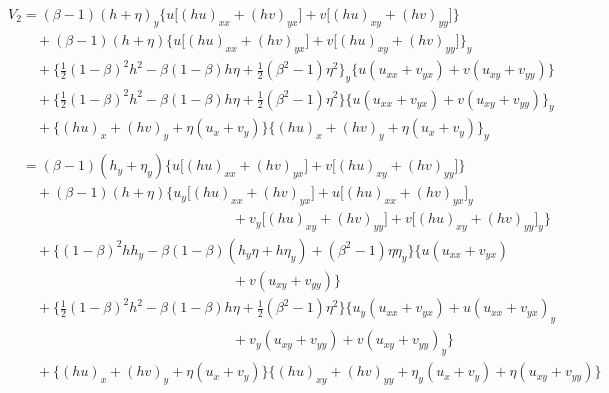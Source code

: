 \documentclass[11pt]{article}
\begin{document}
\newpage
\begin{eqnarray}
&&V_2=  (\beta-1)(h+\eta)_y \bigg\{
        u \Big[ (hu)_{xx} + (hv)_{yx} \Big] +  v \Big[ (hu)_{xy} + (hv)_{yy} \Big] \bigg\}
        \nonumber \\
&& \quad \quad
        + (\beta-1)(h+\eta) \bigg\{
        u \Big[ (hu)_{xx} + (hv)_{yx} \Big] +  v \Big[ (hu)_{xy} + (hv)_{yy} \Big] \bigg\}_y
        \nonumber \\
&& \quad \quad
        +\bigg\{ \frac{1}{2} (1-\beta)^2 h^2 - \beta (1-\beta) h \eta + \frac{1}{2} (\beta^2-1) \eta^2 \bigg\}_y
        \Big\{ u ( u_{xx} + v_{yx} ) + v ( u_{xy} + v_{yy} ) \Big\}   \nonumber  \\
&& \quad \quad
        +\bigg\{ \frac{1}{2} (1-\beta)^2 h^2 - \beta (1-\beta) h \eta + \frac{1}{2} (\beta^2-1) \eta^2 \bigg\}
        \Big\{ u ( u_{xx} + v_{yx} ) + v ( u_{xy} + v_{yy} ) \Big\}_y   \nonumber  \\
&& \quad \quad
        +\Big\{
        (hu)_x + (hv)_y + \eta (u_x+v_y) \Big\}
        \Big\{
        (hu)_x + (hv)_y + \eta (u_x+v_y) \Big\}_y
        \nonumber  \\
        \nonumber  \\
&& \quad
     = (\beta-1)(h_y + \eta_y) \bigg\{
        u \Big[ (hu)_{xx} + (hv)_{yx} \Big] +  v \Big[ (hu)_{xy} + (hv)_{yy} \Big] \bigg\}
        \nonumber \\
&& \quad \quad
        + (\beta-1)(h+\eta) \bigg\{
            u_y \Big[ (hu)_{xx} + (hv)_{yx} \Big]
          + u \Big[ (hu)_{xx} + (hv)_{yx} \Big]_y
        \nonumber \\
&& \quad \quad \quad \quad \quad \quad \quad \quad
   \quad \quad \quad \quad \quad \quad \quad \quad
          + v_y \Big[ (hu)_{xy} + (hv)_{yy} \Big]
          + v \Big[ (hu)_{xy} + (hv)_{yy} \Big]_y
                            \bigg\}
        \nonumber \\
&& \quad \quad
       +\bigg\{
       (1-\beta)^2 h h_y - \beta (1-\beta) (h_y \eta + h \eta_y) + (\beta^2-1) \eta \eta_y
        \bigg\}
        \bigg\{ u ( u_{xx} + v_{yx} )
        \nonumber \\
&& \quad \quad \quad \quad \quad \quad \quad \quad
   \quad \quad \quad \quad \quad \quad \quad \quad
        + v ( u_{xy} + v_{yy} ) \bigg\}
        \nonumber \\
&& \quad \quad
        +\bigg\{ \frac{1}{2} (1-\beta)^2 h^2 - \beta (1-\beta) h \eta + \frac{1}{2} (\beta^2-1) \eta^2 \bigg\}
        \bigg\{ u_y ( u_{xx} + v_{yx} ) + u ( u_{xx} + v_{yx} )_y
        \nonumber \\
&& \quad \quad \quad \quad \quad \quad \quad \quad
   \quad \quad \quad \quad \quad \quad \quad \quad
        + v_y ( u_{xy} + v_{yy} ) + v ( u_{xy} + v_{yy} )_y
        \bigg\}
        \nonumber \\
&& \quad \quad
        +\Big\{
        (hu)_x + (hv)_y + \eta (u_x+v_y) \Big\}
        \Big\{
        (hu)_{xy} + (hv)_{yy} + \eta_y (u_x+v_y) + \eta (u_{xy}+v_{yy}) \Big\}
        \nonumber \\
\end{eqnarray}
\end{document}
